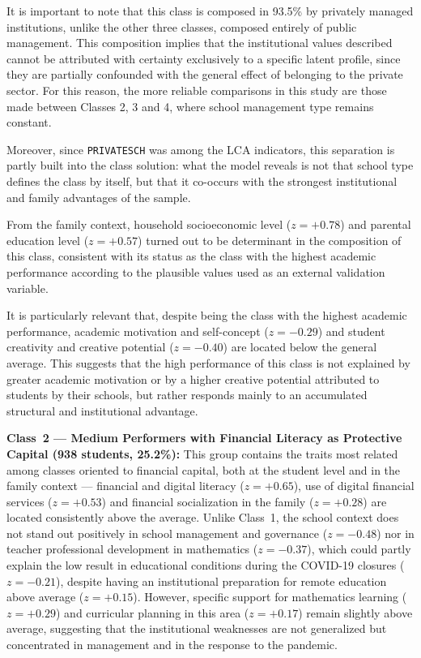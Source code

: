 \documentclass[runningheads]{llncs}
\begin{document}
It is important to note that this class is composed in 93.5\% by
privately managed institutions, unlike the other three classes,
composed entirely of public management. This composition implies
that the institutional values described cannot be attributed
with certainty exclusively to a specific latent profile, since
they are partially confounded with the general effect of
belonging to the private sector. For this reason, the more
reliable comparisons in this study are those made between
Classes 2, 3 and 4, where school management type remains
constant.

Moreover, since \texttt{PRIVATESCH} was among the LCA
indicators, this separation is partly built into the class
solution: what the model reveals is not that school type defines
the class by itself, but that it co-occurs with the strongest
institutional and family advantages of the sample.

From the family context, household socioeconomic level
(\(z = +0.78\)) and parental education level (\(z = +0.57\))
turned out to be determinant in the composition of this class,
consistent with its status as the class with the highest
academic performance according to the plausible values used as
an external validation variable.

It is particularly relevant that, despite being the class with
the highest academic performance, academic motivation and
self-concept (\(z = -0.29\)) and student creativity and creative
potential (\(z = -0.40\)) are located below the general average.
This suggests that the high performance of this class is not
explained by greater academic motivation or by a higher creative
potential attributed to students by their schools, but rather
responds mainly to an accumulated structural and institutional
advantage.

\textbf{Class~2 --- Medium Performers with Financial Literacy as
Protective Capital (938 students, 25.2\%):} This group contains
the traits most related among classes oriented to financial
capital, both at the student level and in the family context ---
financial and digital literacy (\(z = +0.65\)), use of digital
financial services (\(z = +0.53\)) and financial socialization
in the family (\(z = +0.28\)) are located consistently above the
average. Unlike Class~1, the school context does not stand out
positively in school management and governance (\(z = -0.48\))
nor in teacher professional development in mathematics
(\(z = -0.37\)), which could partly explain the low result in
educational conditions during the COVID-19 closures
(\(z = -0.21\)), despite having an institutional preparation for
remote education above average (\(z = +0.15\)). However,
specific support for mathematics learning (\(z = +0.29\)) and
curricular planning in this area (\(z = +0.17\)) remain slightly
above average, suggesting that the institutional weaknesses are
not generalized but concentrated in management and in the
response to the pandemic.
\end{document}
